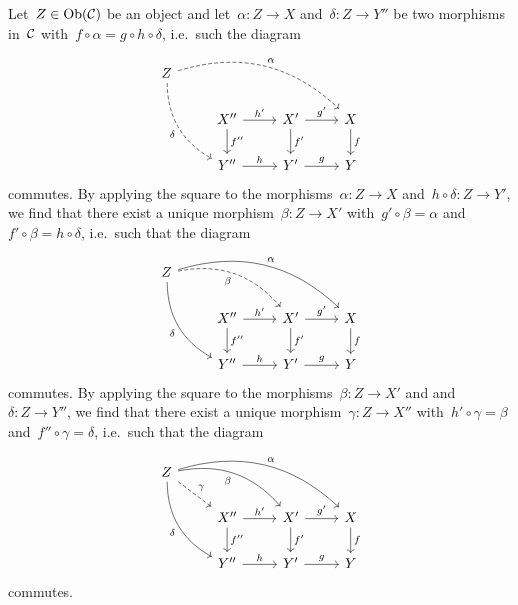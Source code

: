 \section{}





\subsection{}

Let~$Z \in \operatorname{Ob}(\mathcal{C})$ be an object and let~$\alpha \colon Z \to X$ and~$\delta \colon Z \to Y''$ be two morphisms in~$\mathcal{C}$ with~$f \circ \alpha = g \circ h \circ \delta$, i.e.\ such the diagram
\[
  \begin{tikzcd}
      Z
      \arrow[dashed,bend left]{drrr}[above right]{\alpha}
      \arrow[dashed,bend right]{ddr}[below left]{\delta}
    & {}
    & {}
    & {}
    \\
      {}
    & X''
      \arrow{r}[above]{h'}
      \arrow{d}[right]{f''}
    & X'
      \arrow{r}[above]{g'}
      \arrow{d}[right]{f'}
    & X
      \arrow{d}[right]{f}
    \\
      {}
    & Y''
      \arrow{r}[above]{h}
    & Y'
      \arrow{r}[above]{g}
    & Y
  \end{tikzcd}
\]
commutes.
By applying the  {\pb} square to the morphisms~$\alpha \colon Z \to X$ and~$h \circ \delta \colon Z \to Y'$, we find that there exist a unique morphism~$\beta \colon Z \to X'$ with~$g' \circ \beta = \alpha$ and~$f' \circ \beta = h \circ \delta$, i.e.\ such that the diagram
\[
  \begin{tikzcd}
      Z
      \arrow[bend left]{drrr}[above right]{\alpha}
      \arrow[dashed, bend left]{drr}[below left]{\beta}
      \arrow[bend right]{ddr}[below left]{\delta}
    & {}
    & {}
    & {}
    \\
      {}
    & X''
      \arrow{r}[above]{h'}
      \arrow{d}[right]{f''}
    & X'
      \arrow{r}[above]{g'}
      \arrow{d}[right]{f'}
    & X
      \arrow{d}[right]{f}
    \\
      {}
    & Y''
      \arrow{r}[above]{h}
    & Y'
      \arrow{r}[above]{g}
    & Y
  \end{tikzcd}
\]
commutes.
By applying the  {\pb} square to the morphisms~$\beta \colon Z \to X'$ and and~$\delta \colon Z \to Y''$, we find that there exist a unique morphism~$\gamma \colon Z \to X''$ with~$h' \circ \gamma = \beta$ and~$f'' \circ \gamma = \delta$, i.e.\ such that the diagram
\[
  \begin{tikzcd}
      Z
      \arrow[bend left]{drrr}[above right]{\alpha}
      \arrow[bend left]{drr}[below left]{\beta}
      \arrow[dashed]{dr}[above right]{\gamma}
      \arrow[bend right]{ddr}[below left]{\delta}
    & {}
    & {}
    & {}
    \\
      {}
    & X''
      \arrow{r}[above]{h'}
      \arrow{d}[right]{f''}
    & X'
      \arrow{r}[above]{g'}
      \arrow{d}[right]{f'}
    & X
      \arrow{d}[right]{f}
    \\
      {}
    & Y''
      \arrow{r}[above]{h}
    & Y'
      \arrow{r}[above]{g}
    & Y
  \end{tikzcd}
\]
commutes.


